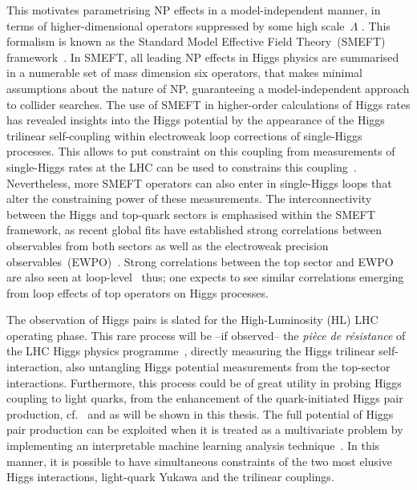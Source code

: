 This motivates parametrising NP effects in a model-independent manner, in terms of higher-dimensional operators suppressed by some high scale~$\Lambda$ . This formalism is known as the Standard Model Effective Field Theory~(SMEFT) framework~\cite{Giudice:2007fh,Grzadkowski:2010es,Contino:2013kra, Elias-Miro:2013eta,Gupta:2014rxa}. In SMEFT, all leading NP effects in Higgs physics are summarised in a numerable set of mass dimension six operators, that makes minimal assumptions about the nature of NP, guaranteeing a model-independent approach to collider searches.
The use of SMEFT in higher-order calculations of Higgs rates has revealed insights into the Higgs potential by the appearance of the Higgs trilinear self-coupling within electroweak loop corrections of single-Higgs processes. This allows to put constraint on this coupling from measurements of single-Higgs rates at the LHC can be used to constrains this coupling~\cite{McCullough:2013rea, Gorbahn:2016uoy, Degrassi:2016wml, Bizon:2016wgr, Maltoni:2017ims, Degrassi:2019yix, Degrassi:2021uik, Haisch:2021hvy}. Nevertheless, more SMEFT operators can also enter in single-Higgs loops that alter the constraining power of these measurements. The interconnectivity between the Higgs and top-quark sectors is  emphasised within the SMEFT framework, as recent global fits have established strong correlations between observables from both sectors as well as the electroweak precision observables~(EWPO)~\cite{Ellis:2020unq}. Strong correlations between the top sector and EWPO are also seen at loop-level~\cite{Dawson:2020oco,Dawson:2022bxd} thus; one expects to see similar correlations emerging from loop effects of top operators on Higgs processes.
\par The observation of Higgs pairs is slated for the High-Luminosity (HL) LHC operating phase. This rare process will be --if observed-- the {\it pi\`ece de r\'esistance} of the LHC Higgs physics programme~\cite{Bernius:2666331}, directly measuring the Higgs trilinear self-interaction, also untangling Higgs potential measurements from the top-sector interactions. Furthermore,  this process could be of great utility in probing Higgs coupling to light quarks, from the enhancement of the quark-initiated Higgs pair production, cf.~\cite{Alasfar:2019pmn,Egana-Ugrinovic:2021uew} and as will be shown in this thesis.  The full potential of Higgs pair production can be exploited when it is treated as a multivariate problem by implementing an interpretable machine learning analysis technique~\cite{Grojean:2020ech}. In this manner, it is possible to have  simultaneous constraints of the two most elusive Higgs interactions, light-quark Yukawa and the trilinear couplings.
